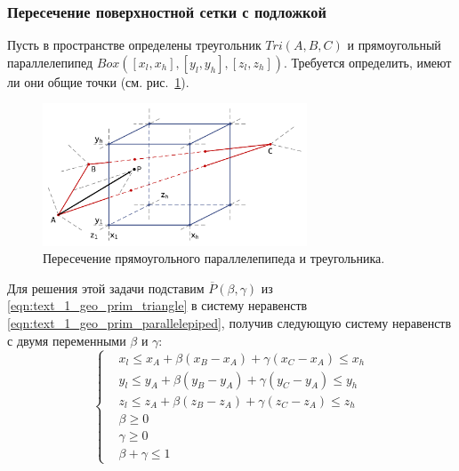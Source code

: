 \subsubsection{Пересечение поверхностной сетки с подложкой}\label{sec:int_with_undermesh}

Пусть в пространстве определены треугольник $Tri(A, B, C)$ и прямоугольный параллелепипед $Box([x_l, x_h], [y_l, y_h], [z_l, z_h])$.
Требуется определить, имеют ли они общие точки (см. рис.~\ref{fig:text_1_geo_prim_tri_block_intersect}).

\begin{figure}[ht]
\centering
\includegraphics[width=0.7\textwidth]{fig/int_tri_block_intersect.pdf}
\singlespacing
{}\caption{Пересечение прямоугольного параллелепипеда и треугольника.}
\label{fig:text_1_geo_prim_tri_block_intersect}
\end{figure}

Для решения этой задачи подставим $\overline{P}(\beta, \gamma)$ из \eqref{eqn:text_1_geo_prim_triangle} в систему неравенств \eqref{eqn:text_1_geo_prim_parallelepiped}, получив следующую систему неравенств с двумя переменными $\beta$ и $\gamma$:
\begin{equation}\label{eqn:text_1_geo_prim_1}
	\left\{
		\begin{aligned}
			& x_l \le x_A + \beta (x_B - x_A) + \gamma (x_C - x_A) \le x_h \\
			& y_l \le y_A + \beta (y_B - y_A) + \gamma (y_C - y_A) \le y_h \\
			& z_l \le z_A + \beta (z_B - z_A) + \gamma (z_C - z_A) \le z_h \\
			& \beta \ge 0 \\
			& \gamma \ge 0 \\
			& \beta + \gamma \le 1
		\end{aligned}
	\right.
\end{equation}

